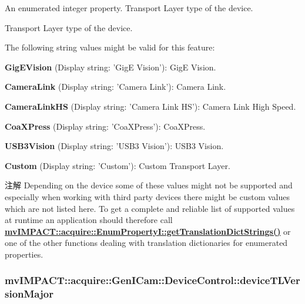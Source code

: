 An enumerated integer property. Transport Layer type of the device. 

Transport Layer type of the device.

The following string values might be valid for this feature\+:
\begin{DoxyItemize}
\item {\bfseries Gig\+E\+Vision} (Display string\+: 'Gig\+E Vision')\+: Gig\+E Vision.
\item {\bfseries Camera\+Link} (Display string\+: 'Camera Link')\+: Camera Link.
\item {\bfseries Camera\+Link\+H\+S} (Display string\+: 'Camera Link H\+S')\+: Camera Link High Speed.
\item {\bfseries Coa\+X\+Press} (Display string\+: 'Coa\+X\+Press')\+: Coa\+X\+Press.
\item {\bfseries U\+S\+B3\+Vision} (Display string\+: 'U\+S\+B3 Vision')\+: U\+S\+B3 Vision.
\item {\bfseries Custom} (Display string\+: 'Custom')\+: Custom Transport Layer.
\end{DoxyItemize}

\begin{DoxyNote}{注解}
Depending on the device some of these values might not be supported and especially when working with third party devices there might be custom values which are not listed here. To get a complete and reliable list of supported values at runtime an application should therefore call {\bfseries \hyperlink{classmv_i_m_p_a_c_t_1_1acquire_1_1_enum_property_i_a0ba6ccbf5ee69784d5d0b537924d26b6}{mv\+I\+M\+P\+A\+C\+T\+::acquire\+::\+Enum\+Property\+I\+::get\+Translation\+Dict\+Strings()}} or one of the other functions dealing with translation dictionaries for enumerated properties. 
\end{DoxyNote}
\hypertarget{classmv_i_m_p_a_c_t_1_1acquire_1_1_gen_i_cam_1_1_device_control_accff8360a9efcd221734d6ef80aa648f}{
\subsubsection[{device\+T\+L\+Version\+Major}]{ mv\+I\+M\+P\+A\+C\+T\+::acquire\+::\+Gen\+I\+Cam\+::\+Device\+Control\+::device\+T\+L\+Version\+Major}}\label{classmv_i_m_p_a_c_t_1_1acquire_1_1_gen_i_cam_1_1_device_control_accff8360a9efcd221734d6ef80aa648f}


